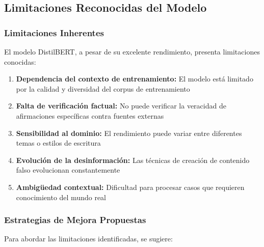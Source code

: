 \subsection{Limitaciones Reconocidas del Modelo}

\subsubsection{Limitaciones Inherentes}

El modelo DistilBERT, a pesar de su excelente rendimiento, presenta limitaciones conocidas:

\begin{enumerate}
    \item \textbf{Dependencia del contexto de entrenamiento:} El modelo está limitado por la calidad y diversidad del corpus de entrenamiento
    \item \textbf{Falta de verificación factual:} No puede verificar la veracidad de afirmaciones específicas contra fuentes externas
    \item \textbf{Sensibilidad al dominio:} El rendimiento puede variar entre diferentes temas o estilos de escritura
    \item \textbf{Evolución de la desinformación:} Las técnicas de creación de contenido falso evolucionan constantemente
    \item \textbf{Ambigüedad contextual:} Dificultad para procesar casos que requieren conocimiento del mundo real
\end{enumerate}

\subsubsection{Estrategias de Mejora Propuestas}

Para abordar las limitaciones identificadas, se sugiere:

